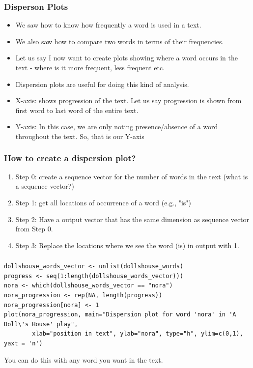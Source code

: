 \documentclass{beamer}
\begin{document}
\begin{frame}
\frametitle{Disperson Plots}
\begin{itemize}
\item We saw how to know how frequently a word is used in a text.
\item We also saw how to compare two words in terms of their frequencies. \pause
\item Let us say I now want to create plots showing where a word occurs in the text - where is it more frequent, less frequent etc.
\item Dispersion plots are useful for doing this kind of analysis. \pause
\item X-axis: shows progression of the text. Let us say progression is shown from first word to last word of the entire text.
\item Y-axis: In this case, we are only noting presence/absence of a word throughout the text. So, that is our Y-axis
\end{itemize}
\end{frame}

\begin{frame}[fragile]
\frametitle{How to create a dispersion plot?}
\begin{enumerate}
\item Step 0: create a sequence vector for the number of words in the text (what is a sequence vector?) \pause
\item Step 1: get all locations of occurrence of a word (e.g., "is")
\item Step 2: Have a output vector that has the same dimension as sequence vector from Step 0. 
\item Step 3: Replace the locations where we see the word (is) in output with 1.
\end{enumerate}
\end{frame}

\begin{frame}[fragile]
\frametitle{}
\tiny
\begin{verbatim}
dollshouse_words_vector <- unlist(dollshouse_words)
progress <- seq(1:length(dollshouse_words_vector)))
nora <- which(dollshouse_words_vector == "nora") 
nora_progression <- rep(NA, length(progress))
nora_progression[nora] <- 1
plot(nora_progression, main="Dispersion plot for word 'nora' in 'A Doll\'s House' play", 
        xlab="position in text", ylab="nora", type="h", ylim=c(0,1), yaxt = 'n')
\end{verbatim}
\normalsize You can do this with any word you want in the text. 
\end{frame}
\end{document}
